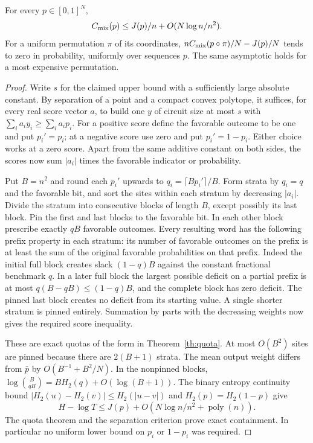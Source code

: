 \begin{theorem}\label{th:marginal}
For every $p\in[0,1]^N$,
\[
 C_{\rm mix}(p)\le J(p)/n+O(N\log n/n^2).
\]
For a uniform permutation $\pi$ of its coordinates, $n C_{\rm mix}(p\circ\pi)/N-J(p)/N$ tends to zero in probability, uniformly over sequences $p$. The same asymptotic holds for a most expensive permutation.
\end{theorem}
\begin{proof}
Write $s$ for the claimed upper bound with a sufficiently large absolute constant. By separation of a point and a compact convex polytope, it suffices, for every real score vector $a$, to build one $y$ of circuit size at most $s$ with $\sum_i a_i y_i\ge\sum_i a_i p_i$. For a positive score define the favorable outcome to be one and put $p_i'=p_i$; at a negative score use zero and put $p_i'=1-p_i$. Either choice works at a zero score. Apart from the same additive constant on both sides, the scores now sum $|a_i|$ times the favorable indicator or probability.

Put $B=n^2$ and round each $p_i'$ upwards to $q_i=\lceil Bp_i'\rceil/B$. Form strata by $q_i=q$ and the favorable bit, and sort the sites within each stratum by decreasing $|a_i|$. Divide the stratum into consecutive blocks of length $B$, except possibly its last block. Pin the first and last blocks to the favorable bit. In each other block prescribe exactly $q B$ favorable outcomes. Every resulting word has the following prefix property in each stratum: its number of favorable outcomes on the prefix is at least the sum of the original favorable probabilities on that prefix. Indeed the initial full block creates slack $(1-q)B$ against the constant fractional benchmark $q$. In a later full block the largest possible deficit on a partial prefix is at most $q(B-qB)\le(1-q)B$, and the complete block has zero deficit. The pinned last block creates no deficit from its starting value. A single shorter stratum is pinned entirely. Summation by parts with the decreasing weights now gives the required score inequality.

These are exact quotas of the form in Theorem~\ref{th:quota}. At most $O(B^2)$ sites are pinned because there are $2(B+1)$ strata. The mean output weight differs from $\bar p$ by $O(B^{-1}+B^2/N)$. In the nonpinned blocks, $\log\binom B{qB}=B H_2(q)+O(\log(B+1))$. The binary entropy continuity bound $|H_2(u)-H_2(v)|\le H_2(|u-v|)$ and $H_2(p)=H_2(1-p)$ give
\[
 H-\log T\le J(p)+O(N\log n/n^2+\operatorname{poly}(n)).
\]
The quota theorem and the separation criterion prove exact containment. In particular no uniform lower bound on $p_i$ or $1-p_i$ was required.


\end{proof}
